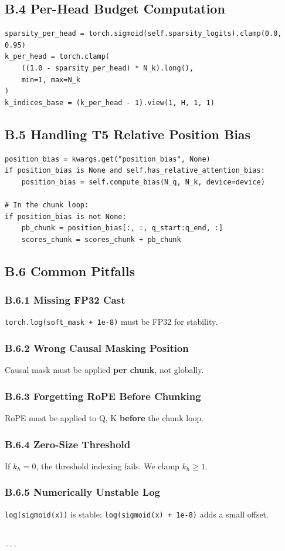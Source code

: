 \subsection{B.4 Per-Head Budget Computation}

\begin{lstlisting}
sparsity_per_head = torch.sigmoid(self.sparsity_logits).clamp(0.0, 0.95)
k_per_head = torch.clamp(
    ((1.0 - sparsity_per_head) * N_k).long(),
    min=1, max=N_k
)
k_indices_base = (k_per_head - 1).view(1, H, 1, 1)
\end{lstlisting}

\subsection{B.5 Handling T5 Relative Position Bias}

\begin{lstlisting}
position_bias = kwargs.get("position_bias", None)
if position_bias is None and self.has_relative_attention_bias:
    position_bias = self.compute_bias(N_q, N_k, device=device)

# In the chunk loop:
if position_bias is not None:
    pb_chunk = position_bias[:, :, q_start:q_end, :]
    scores_chunk = scores_chunk + pb_chunk
\end{lstlisting}

\subsection{B.6 Common Pitfalls}

\subsubsection{B.6.1 Missing FP32 Cast}

\texttt{torch.log(soft\_mask + 1e-8)} must be FP32 for stability.

\subsubsection{B.6.2 Wrong Causal Masking Position}

Causal mask must be applied \textbf{per chunk}, not globally.

\subsubsection{B.6.3 Forgetting RoPE Before Chunking}

RoPE must be applied to Q, K \textbf{before} the chunk loop.

\subsubsection{B.6.4 Zero-Size Threshold}

If $k_h = 0$, the threshold indexing fails. We clamp $k_h \ge 1$.

\subsubsection{B.6.5 Numerically Unstable Log}

\texttt{log(sigmoid(x))} is stable; \texttt{log(sigmoid(x) + 1e-8)} adds a small offset.
\begin{lstlisting}

---
\end{lstlisting}